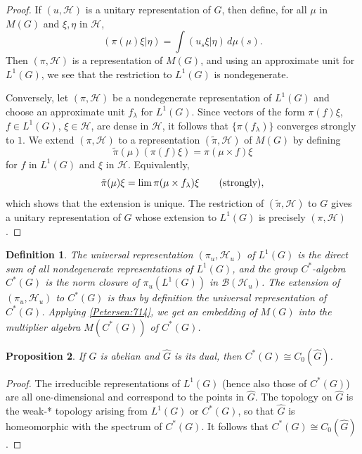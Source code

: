\documentclass{book}
\newtheorem{definition}{Definition}[section]
\newtheorem{proposition}[definition]{Proposition}
\def\cstar{\(C^*\)-algebra}
\begin{document}
\begin{proof}
  If \((u,\mathcal{H})\) is a unitary representation of \(G\), then define, for all \(\mu\) in \(M(G)\)
  and \(\xi,\eta\) in \(\mathcal{H}\),
  \[
    (\pi(\mu)\xi|\eta) = \int (u_s\xi|\eta)\,d\mu(s).
  \]
  Then \((\pi,\mathcal{H})\) is a representation of \(M(G)\), and using an approximate unit for
  \(L^1(G)\), we see that the restriction to \(L^1(G)\) is nondegenerate.\par
  Conversely, let \((\pi,\mathcal{H})\) be a nondegenerate representation of \(L^1(G)\) and
  choose an approximate unit \({f_\lambda}\) for \(L^1(G)\). Since vectors of the form \(\pi(f)\xi\),
  \(f \in L^1(G)\), \(\xi \in\mathcal{H}\), are dense in \(\mathcal{H}\), it follows that \(\{\pi(f_\lambda)\}\) converges strongly
  to \(1\). We extend \((\pi,\mathcal{H})\) to a representation \((\tilde{\pi},\mathcal{H})\) of \(M(G)\) by defining
  \[
    \tilde{\pi}(\mu)(\pi(f)\xi) =\pi(\mu\times f)\xi
  \]
  for \(f\) in \(L^1(G)\) and \(\xi\) in \(\mathcal{H}\). Equivalently,
  \[
    \tilde{\pi}(\mu)\xi =\lim\pi(\mu\times f_\lambda)\xi\qquad\textnormal{(strongly)},
  \]
  which shows that the extension is unique. The restriction of \((\tilde{\pi},\mathcal{H})\) to \(G\) gives a
  unitary representation of \(G\) whose extension to \(L^1(G)\) is precisely \((\pi,\mathcal{H})\).
\end{proof}
\begin{definition}\label{Petersen:715}
  The \textnormal{universal representation} \((\pi_u,\mathcal{H}_u)\) of \(L^1(G)\) is the direct sum of all nondegenerate
  representations of \(L^1(G)\), and the \textnormal{group \cstar} \(C^*(G)\) is the norm closure
  of \(\pi_u(L^1(G))\) in \(\mathcal{B}(\mathcal{H}_u)\).
  The extension of \((\pi_u,\mathcal{H}_u)\) to \(C^*(G)\) is thus by definition the universal representation of \(C^*(G)\).
  Applying \ref{Petersen:714}, we get an embedding of \(M(G)\) into the multiplier algebra \(M(C^*(G))\) of \(C^*(G)\).
\end{definition}
\begin{proposition}\label{Petersen:716}
  If \(G\) is abelian and \(\hat{G}\) is its dual, then \(C^*(G)\cong C_0(\hat{G})\).
\end{proposition}
\begin{proof}
  The irreducible representations of \(L^1(G)\) (hence also those of \(C^*(G)\))
  are all one-dimensional and correspond to the points in \(\hat{G}\). The topology on \(\hat{G}\)
  is the weak-* topology arising from \(L^1(G)\) or \(C^*(G)\), so that \(\hat{G}\) is homeomorphic
  with the spectrum of \(C^*(G)\). It follows that \(C^*(G)\cong C_0(\hat{G})\).
\end{proof}
\end{document}
